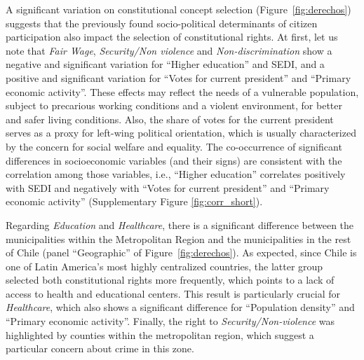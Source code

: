 \documentclass[onecolumn]{article}
\begin{document}

A significant variation on constitutional concept selection (Figure~\ref{fig:derechos}) suggests that the previously found socio-political determinants of citizen participation also impact the selection of constitutional rights. At first, let us note that \textit{Fair Wage}, \textit{Security/Non violence} and \textit{Non-discrimination} show a negative and significant variation for ``Higher education'' and SEDI, and a positive and significant variation for ``Votes for current president'' and ``Primary economic activity''. These effects may reflect the needs of a vulnerable population, subject to precarious working conditions and a violent environment, for better and safer living conditions. Also, the share of votes for the current president serves as a proxy for left-wing political orientation, which is usually characterized by the concern for social welfare and equality. The co-occurrence of significant differences in socioeconomic variables (and their signs) are consistent with the correlation among those variables, i.e., ``Higher education'' correlates positively with SEDI and negatively with ``Votes for current president'' and ``Primary economic activity'' (Supplementary Figure \ref{fig:corr_short}). 


Regarding \textit{Education} and \textit{Healthcare}, there is a significant difference between the municipalities within the Metropolitan Region and the municipalities in the rest of Chile (panel ``Geographic'' of Figure~\ref{fig:derechos}). As expected, since Chile is one of Latin America's most highly centralized countries, the latter group selected both constitutional rights more frequently, which points to a lack of access to health and educational centers. This result is particularly crucial for \textit{Healthcare}, which also shows a significant difference for ``Population density'' and ``Primary economic activity''.  Finally, the right to \textit{Security/Non-violence} was highlighted by counties within the metropolitan region, which suggest a particular concern about crime in this zone.
\end{document}
